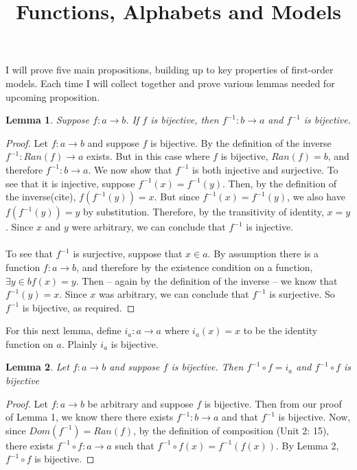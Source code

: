 \documentclass{article}
\title{Functions, Alphabets and Models}
\begin{document}
\maketitle
\newtheorem{theorem}{Theorem}
\newtheorem{proposition}{Proposition}
\newtheorem{lemma}[theorem]{Lemma}

I will prove five main propositions, building up to key properties of first-order models. Each time I will collect together and prove various lemmas needed for upcoming proposition.

\begin{lemma}
Suppose $ f : a \rightarrow b$. If $f$ is bijective, then $f^{-1}: b \rightarrow a$ and $f^{-1}$ is bijective. \end{lemma}
\begin{proof}
Let $ f : a \rightarrow b$ and suppose $f$ is bijective. By the definition of the inverse $f^{-1}: Ran(f) \rightarrow a$ exists. But in this case where $f$ is bijective, $Ran(f) = b$, and therefore
$f^{-1}: b \rightarrow a$. We now show that $f^{-1}$ is both injective and surjective. To see that it is injective, suppose $f^{-1}(x) = f^{-1}(y)$. Then, by the definition of the inverse(cite), $f(f^{-1}(y)) = x$. But since $f^{-1}(x) = f^{-1}(y)$, we also have $f(f^{-1}(y)) = y$ by substitution. Therefore, by the transitivity of identity, $x = y$. Since $x$ and $y$ were arbitrary, we can conclude that $f^{-1}$ is injective. \\ \\To see that $f^{-1}$ is surjective, suppose that $x \in a$. By assumption there is a function $ f : a \rightarrow b$, and therefore by the existence condition on a function, $\exists y \in b f(x) = y$. Then – again by the definition of the inverse – we know that $f^{-1}(y) = x$. Since $x$ was arbitrary, we can conclude that $f^{-1}$ is surjective. So $f^{-1}$ is bijective, as required. 
\end{proof}For this next lemma, define $i_a: a \rightarrow a$ where $i_a(x) = x$ to be the identity function on $a$. Plainly $i_a$ is bijective.
\begin{lemma}
Let $f : a \rightarrow b$ and suppose $f$ is bijective. Then $f^{-1} \circ f = i_a$ and $f^{-1} \circ f$  is bijective \end{lemma}
\begin{proof}
Let $f : a \rightarrow b$ be arbitrary and suppose $f$ is bijective. Then from our proof of Lemma 1, we know there there exists $f^{-1}: b \rightarrow a$ and that $f^{-1}$ is bijective. Now, since $Dom(f^{-1}) = Ran(f)$, by the definition of composition (Unit 2: 15), there exists $f^{-1} \circ f : a \rightarrow a$ such that $f^{-1} \circ f(x) = f^{-1}(f(x))$. By Lemma 2, $f^{-1} \circ f$ is bijective.
\end{proof}
\end{document}
